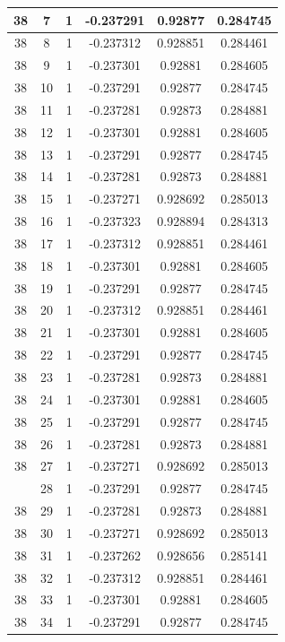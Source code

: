 \documentclass[12pt,a4paper]{article}
\numberwithin{equation}{section}
\numberwithin{figure}{section}
\numberwithin{table}{section}
\begin{document}
\begin{longtable}{|c|c|c|c|c|c|}
38 & 7 & 1 & -0.237291 & 0.92877 & 0.284745 \\ \hline
38 & 8 & 1 & -0.237312 & 0.928851 & 0.284461 \\ \hline
38 & 9 & 1 & -0.237301 & 0.92881 & 0.284605 \\ \hline
38 & 10 & 1 & -0.237291 & 0.92877 & 0.284745 \\ \hline
38 & 11 & 1 & -0.237281 & 0.92873 & 0.284881 \\ \hline
38 & 12 & 1 & -0.237301 & 0.92881 & 0.284605 \\ \hline
38 & 13 & 1 & -0.237291 & 0.92877 & 0.284745 \\ \hline
38 & 14 & 1 & -0.237281 & 0.92873 & 0.284881 \\ \hline
38 & 15 & 1 & -0.237271 & 0.928692 & 0.285013 \\ \hline
38 & 16 & 1 & -0.237323 & 0.928894 & 0.284313 \\ \hline
38 & 17 & 1 & -0.237312 & 0.928851 & 0.284461 \\ \hline
38 & 18 & 1 & -0.237301 & 0.92881 & 0.284605 \\ \hline
38 & 19 & 1 & -0.237291 & 0.92877 & 0.284745 \\ \hline
38 & 20 & 1 & -0.237312 & 0.928851 & 0.284461 \\ \hline
38 & 21 & 1 & -0.237301 & 0.92881 & 0.284605 \\ \hline
38 & 22 & 1 & -0.237291 & 0.92877 & 0.284745 \\ \hline
38 & 23 & 1 & -0.237281 & 0.92873 & 0.284881 \\ \hline
38 & 24 & 1 & -0.237301 & 0.92881 & 0.284605 \\ \hline
38 & 25 & 1 & -0.237291 & 0.92877 & 0.284745 \\ \hline
38 & 26 & 1 & -0.237281 & 0.92873 & 0.284881 \\ \hline
38 & 27 & 1 & -0.237271 & 0.928692 & 0.285013 \\ \hline
\pagebreak
38 & 28 & 1 & -0.237291 & 0.92877 & 0.284745 \\ \hline
38 & 29 & 1 & -0.237281 & 0.92873 & 0.284881 \\ \hline
38 & 30 & 1 & -0.237271 & 0.928692 & 0.285013 \\ \hline
38 & 31 & 1 & -0.237262 & 0.928656 & 0.285141 \\ \hline
38 & 32 & 1 & -0.237312 & 0.928851 & 0.284461 \\ \hline
38 & 33 & 1 & -0.237301 & 0.92881 & 0.284605 \\ \hline
38 & 34 & 1 & -0.237291 & 0.92877 & 0.284745 \\ \hline

\end{longtable}
\end{document}
